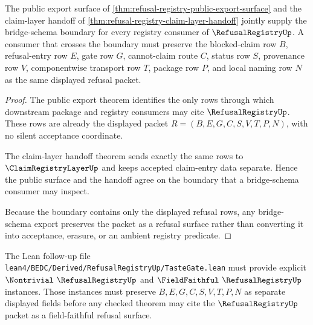 \begin{theorem}
\label{thm:refusal-registry-bridge-schema-export}
The public export surface of \autoref{thm:refusal-registry-public-export-surface} and the claim-layer handoff of \autoref{thm:refusal-registry-claim-layer-handoff} jointly supply the bridge-schema boundary for every registry consumer of $\RefusalRegistryUp$. A consumer that crosses the boundary must preserve the blocked-claim row $B$, refusal-entry row $E$, gate row $G$, cannot-claim route $C$, status row $S$, provenance row $V$, componentwise transport row $T$, package row $P$, and local naming row $N$ as the same displayed refusal packet.
\end{theorem}
\begin{proof}
The public export theorem identifies the only rows through which downstream package and registry consumers may cite $\RefusalRegistryUp$. These rows are already the displayed packet $R=(B,E,G,C,S,V,T,P,N)$, with no silent acceptance coordinate.

The claim-layer handoff theorem sends exactly the same rows to $\ClaimRegistryLayerUp$ and keeps accepted claim-entry data separate. Hence the public surface and the handoff agree on the boundary that a bridge-schema consumer may inspect.

Because the boundary contains only the displayed refusal rows, any bridge-schema export preserves the packet as a refusal surface rather than converting it into acceptance, erasure, or an ambient registry predicate.
\end{proof}



The Lean follow-up file \texttt{lean4/BEDC/Derived/RefusalRegistryUp/TasteGate.lean} must provide explicit $\Nontrivial\ \RefusalRegistryUp$ and $\FieldFaithful\ \RefusalRegistryUp$ instances. Those instances must preserve $B,E,G,C,S,V,T,P,N$ as separate displayed fields before any checked theorem may cite the $\RefusalRegistryUp$ packet as a field-faithful refusal surface.

